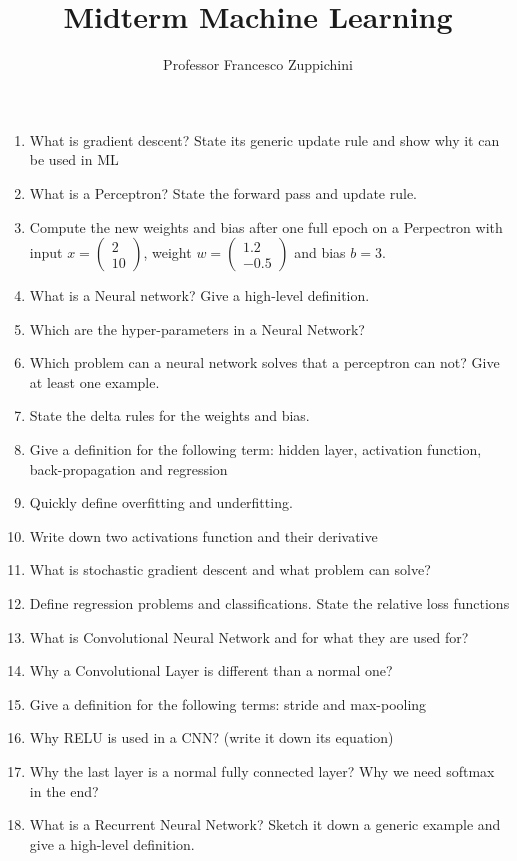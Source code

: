\documentclass[11pt]{article}
\title{Midterm Machine Learning}
\author{Professor Francesco Zuppichini}
\begin{document}
\maketitle
\begin{enumerate}
	\item What is gradient descent? State its generic update rule and show why it can be used in ML
	\item What is a Perceptron? State the forward pass and update rule.
	\item Compute the new weights and bias after one full epoch on a Perpectron with input $x = \begin{pmatrix}
	2 \\ 
	10	
	\end{pmatrix}$, weight $w = \begin{pmatrix}
		1.2 \\ 
		-0.5
	\end{pmatrix}$ and bias $b = 3$.
	\item What is a Neural network? Give a high-level definition.
	\item Which are the hyper-parameters in a Neural Network? 
	\item Which problem can a neural network solves that a perceptron can not? Give at least one example.
	\item State the delta rules for the weights and bias.
	\item Give a definition for the following term: hidden layer, activation function, back-propagation and regression
	\item Quickly define overfitting and underfitting.
	\item Write down  two activations function and their derivative
	\item What is stochastic gradient descent and what problem can solve?
	\item Define regression problems and classifications. State the relative loss functions
	\item What is Convolutional Neural Network and for what they are used for?
	\item Why a Convolutional Layer is different than a normal one?
	\item Give a definition for the following terms: stride and max-pooling
	\item Why RELU is used in a CNN? (write it down its equation)
	\item Why the last layer is a normal fully connected layer? Why we need softmax in the end?
	\item What is a Recurrent Neural Network? Sketch it down a generic example and give a high-level definition.

\end{enumerate}
\end{document}
